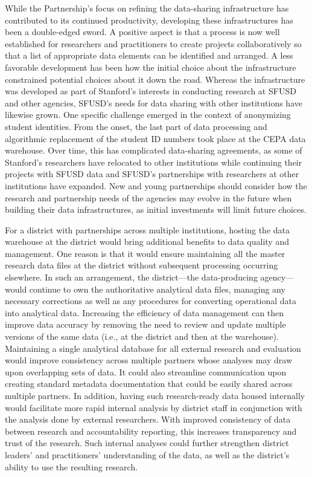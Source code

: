 While the Partnership's focus on refining the data-sharing infrastructure has contributed to its continued productivity, developing these infrastructures has been a double-edged sword. A positive aspect is that a process is now well established for researchers and practitioners to create projects collaboratively so that a list of appropriate data elements can be identified and arranged. A less favorable development has been how the initial choice about the infrastructure constrained potential choices about it down the road. Whereas the infrastructure was developed as part of Stanford's interests in conducting research at SFUSD and other agencies, SFUSD's needs for data sharing with other institutions have likewise grown. One specific challenge emerged in the context of anonymizing student identities. From the onset, the last part of data processing and algorithmic replacement of the student ID numbers took place at the CEPA data warehouse. Over time, this has complicated data-sharing agreements, as some of Stanford's researchers have relocated to other institutions while continuing their projects with SFUSD data and SFUSD's partnerships with researchers at other institutions have expanded. New and young partnerships should consider how the research and partnership needs of the agencies may evolve in the future when building their data infrastructures, as initial investments will limit future choices.

For a district with partnerships across multiple institutions, hosting the data warehouse at the district would bring additional benefits to data quality and management. One reason is that it would ensure maintaining all the master research data files at the district without subsequent processing occurring elsewhere. In such an arrangement, the district---the data-producing agency---would continue to own the authoritative analytical data files, managing any necessary corrections as well as any procedures for converting operational data into analytical data. Increasing the efficiency of data management can then improve data accuracy by removing the need to review and update multiple versions of the same data (i.e., at the district and then at the warehouse). Maintaining a single analytical database for all external research and evaluation would improve consistency across multiple partners whose analyses may draw upon overlapping sets of data. It could also streamline communication upon creating standard metadata documentation that could be easily shared across multiple partners. In addition, having such research-ready data housed internally would facilitate more rapid internal analysis by district staff in conjunction with the analysis done by external researchers. With improved consistency of data between research and accountability reporting, this increases transparency and trust of the research. Such internal analyses could further strengthen district leaders' and practitioners' understanding of the data, as well as the district's ability to use the resulting research.

